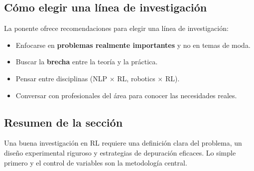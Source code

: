 \subsection{Cómo elegir una línea de investigación}

La ponente ofrece recomendaciones para elegir una línea de investigación:
\begin{itemize}
    \item Enfocarse en \textbf{problemas realmente importantes} y no en temas de moda.
    \item Buscar la \textbf{brecha} entre la teoría y la práctica.
    \item Pensar entre disciplinas (NLP $\times$ RL, robotics $\times$ RL).
    \item Conversar con profesionales del área para conocer las necesidades reales.
\end{itemize}

\subsection{Resumen de la sección}

Una buena investigación en RL requiere una definición clara del problema, un diseño experimental riguroso y estrategias de depuración eficaces. Lo simple primero y el control de variables son la metodología central.

